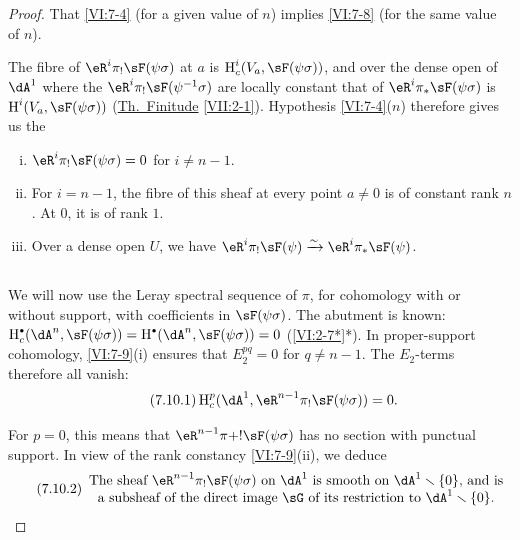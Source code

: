 \begin{proof}[Proof]
That \ref{VI:7-4} (for a given value of $n$) implies \ref{VI:7-8}
(for the same value of $n$).

The fibre of $\eR^i \pi_! \sF(\psi\sigma)$ at $a$ is
$\h_c^i(V_a,\sF(\psi\sigma))$, and over the dense open of $\dA^1$ where the
$\eR^i \pi_!\sF(\psi^{-1}\sigma)$ are locally constant that of
$\eR^i \pi_\ast \sF(\psi\sigma)$ is $\h^i(V_a,\sF(\psi\sigma))$
(\hyperref[VII]{Th.\ Finitude} \ref{VII:2-1}). Hypothesis \ref{VI:7-4}($n$)
therefore gives us the 





\begin{lemma_}\label{VI:7-9}
\begin{enumerate}[(i)]
  \item $\eR^i \pi_! \sF(\psi\sigma)=0$ for $i\ne n-1$.
  \item For $i=n-1$, the fibre of this sheaf at every point $a\ne 0$ is of
    constant rank $n$. At $0$, it is of rank $1$.
  \item Over a dense open $U$, we have
    $\eR^i \pi_! \sF(\psi) \iso \eR^i \pi_\ast \sF(\psi)$.
\end{enumerate}
\end{lemma_}





\subsection{}\label{VI:7-10}

We will now use the Leray spectral sequence of $\pi$, for
cohomology with or without support, with coefficients in $\sF(\psi\sigma)$.
The abutment is known:
$\h_c^\bullet(\dA^n,\sF(\psi\sigma))=\h^\bullet(\dA^n,\sF(\psi\sigma)) = 0$
(\ref{VI:2-7*}*). In proper-support cohomology, \ref{VI:7-9}(i) ensures that
$E_2^{pq}=0$ for $q\ne n-1$. The $E_2$-terms therefore all vanish: 
\begin{equation*}\tag{7.10.1}\label{VI:eq:7-10-1}
  \h_c^p(\dA^1,\eR^{n-1} \pi_!\sF(\psi\sigma)) = 0 \text{.} 
\end{equation*}

For $p=0$, this means that $\eR^{n-1}\pi+! \sF(\psi\sigma)$ has no section
with punctual support. In view of the rank constancy \ref{VI:7-9}(ii), we deduce 
\begin{equation*}\tag{7.10.2}\label{VI:eq:7-10-2}
  \begin{array}{c}
    \text{The sheaf $\eR^{n-1} \pi_! \sF(\psi\sigma)$ on $\dA^1$ is smooth on $\dA^1\setminus \{0\}$, and is} \\
    \text{a subsheaf of the direct image $\sG$ of its restriction to $\dA^1\setminus \{0\}$.}
  \end{array}
\end{equation*}


\end{proof}
